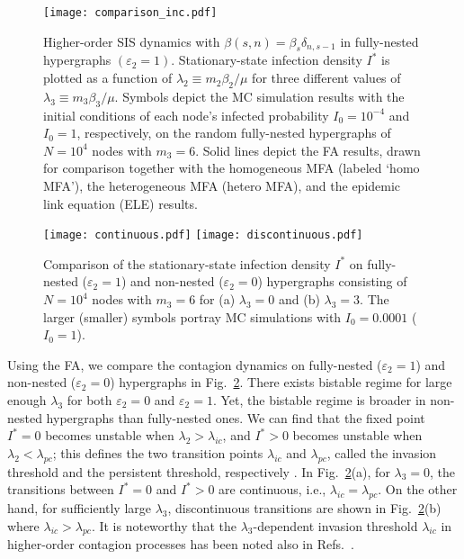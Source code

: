 \documentclass[aps,pre,twocolumn,nofootinbib,superscriptaddress,showpacs,showkeys]{revtex4-1}
\begin{document}
\begin{figure}
\centering
\texttt{[image: comparison\_inc.pdf]}
\caption{Higher-order SIS dynamics with $\beta(s,n)=\beta_s\delta_{n,s-1}$ in fully-nested hypergraphs $(\varepsilon_2=1)$. Stationary-state infection density $I^*$ is plotted as a function of $\lambda_2\equiv m_2\beta_2/\mu$ for three different values of $\lambda_3\equiv m_3\beta_3/\mu$. Symbols depict the MC simulation results with the initial conditions of each node's infected probability $I_0=10^{-4}$ and $I_0=1$, respectively, on the random fully-nested hypergraphs of $N=10^4$ nodes with $m_3=6$. Solid lines depict the FA results, drawn for comparison together with the homogeneous MFA (labeled {`homo MFA'}), the heterogeneous MFA ({hetero MFA}), and the epidemic link equation (ELE) results.}
    \label{fig:compari}
\end{figure}

\begin{figure}[t]
    \centering
    \texttt{[image: continuous.pdf]}
    \texttt{[image: discontinuous.pdf]}
    \caption{Comparison of the stationary-state infection density $I^*$ on fully-nested ($\varepsilon_2=1$) and non-nested ($\varepsilon_2=0$) hypergraphs consisting of $N=10^4$ nodes with $m_3=6$ for (a) $\lambda_3=0$ and (b) $\lambda_3=3$. The larger (smaller) symbols portray MC simulations with $I_0=0.0001$ ($I_0=1$).}
\label{fig:compar}
\end{figure}

Using the FA, we compare the contagion dynamics on fully-nested ($\varepsilon_2=1$) and non-nested ($\varepsilon_2=0$) hypergraphs in Fig.~\ref{fig:compar}. There exists bistable regime for large enough $\lambda_3$ for both $\varepsilon_2=0$ and $\varepsilon_2=1$. Yet, the bistable regime is broader in non-nested hypergraphs than fully-nested ones. We can find that the fixed point $I^*=0$ becomes unstable when $\lambda_2>\lambda_{ic}$, and $I^*>0$ becomes unstable when $\lambda_2<\lambda_{pc}$; this defines the two transition points $\lambda_{ic}$ and $\lambda_{pc}$, called the invasion threshold and the persistent threshold, respectively \cite{universal}. 
In Fig.~\ref{fig:compar}(a), for $\lambda_3=0$, the transitions between $I^*=0$ and $I^*>0$ are continuous, i.e., $\lambda_{ic}=\lambda_{pc}$. On the other hand, for sufficiently large $\lambda_3$, 
discontinuous transitions are shown in Fig.~\ref{fig:compar}(b) where $\lambda_{ic}>\lambda_{pc}$. 
It is noteworthy that the $\lambda_3$-dependent invasion threshold $\lambda_{ic}$ in higher-order contagion processes has been noted also in Refs.~\cite{cca,st2022influential}. 
\end{document}
